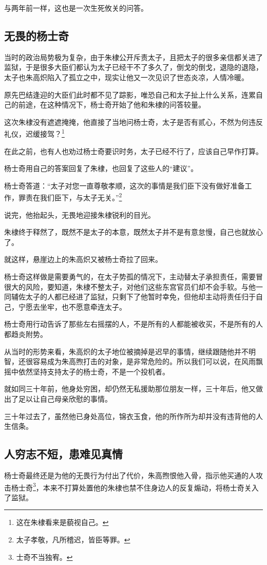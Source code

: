 \begin{multicols}{\theparacolNo}
与两年前一样，这也是一次生死攸关的问答。

\subsection{无畏的杨士奇}
当时的政治局势极为复杂，由于朱棣公开斥责太子，且把太子的很多亲信都关进了监狱，于是很多大臣们都认为太子已经干不了多久了，倒戈的倒戈，退隐的退隐，太子也朱高炽陷入了孤立之中，现实让他又一次见识了世态炎凉，人情冷暖。

原先巴结逢迎的大臣们此时都不见了踪影，唯恐自己和太子扯上什么关系，连累自己的前途，在这种情况下，杨士奇开始了他和朱棣的问答较量。

这次朱棣没有遮遮掩掩，他直接了当地问杨士奇，太子是否有贰心，不然为何违反礼仪，迟缓接驾？\footnote{这在朱棣看来是藐视自己。}

在此之前，也有人也劝过杨士奇要识时务，太子已经不行了，应该自己早作打算。

杨士奇用自己的答案回复了朱棣，也回复了这些人的“建议”。

杨士奇答道：“太子对您一直尊敬孝顺，这次的事情是我们臣下没有做好准备工作，罪责在我们臣下，与太子无关。”\footnote{太子孝敬，凡所稽迟，皆臣等罪。}

说完，他抬起头，无畏地迎接朱棣锐利的目光。

朱棣终于释然了，既然不是太子的本意，既然太子并不是有意怠慢，自己也就放心了。

就这样，悬崖边上的朱高炽又被杨士奇拉了回来。

杨士奇这样做是需要勇气的，在太子势孤的情况下，主动替太子承担责任，需要冒很大的风险，要知道，朱棣不整太子，对他们这些东宫官员们却不会手软。与他一同辅佐太子的人都已经进了监狱，只剩下了他暂时幸免，但他却主动将责任归于自己，宁愿去坐牢，也不愿意牵连太子。

杨士奇用行动告诉了那些左右摇摆的人，不是所有的人都能被收买，不是所有的人都趋炎附势。

从当时的形势来看，朱高炽的太子地位被摘掉是迟早的事情，继续跟随他并不明智，还很容易成为朱高煦打击的对象，是非常危险的。所以我们可以说，在风雨飘摇中依然坚持支持太子的杨士奇，不是一个投机者。

就如同三十年前，他身处穷困，却仍然无私援助那位朋友一样，三十年后，他又做出了足以让自己母亲欣慰的事情。

三十年过去了，虽然他已身处高位，锦衣玉食，他的所作所为却并没有违背他的人生信条。

\subsection{人穷志不短，患难见真情}
杨士奇最终还是为他的无畏行为付出了代价，朱高煦恨他入骨，指示他买通的人攻击杨士奇\footnote{士奇不当独宥。}，本来不打算处置他的朱棣也禁不住身边人的反复煽动，将杨士奇关入了监狱。


\end{multicols}
